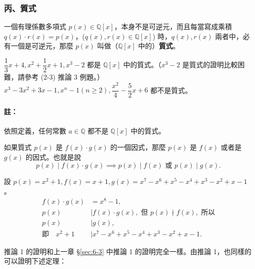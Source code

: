 \subsubsection*{丙、質式}\label{subsec:7-1-c}

\begin{definition*}
一個有理係數多項式 $p(x) \in \mathbb{Q}[x]$，本身不是可逆元，而且每當寫成乘積 $q(x) \cdot r(x) = p(x)$，($q(x), r(x) \in \mathbb{Q}[x]$) 時，$q(x), r(x)$ 兩者中，必有一個是可逆元，那麼 $p(x)$ 叫做（$\mathbb{Q}[x]$ 中的）\textbf{質式}。
\end{definition*}

\begin{example}\label{ex:7-1-8}
$\dfrac{1}{3}x+4, x^2+\dfrac{1}{2}x+1, x^3-2$ 都是 $\mathbb{Q}[x]$ 中的質式。（$x^3-2$ 是質式的證明比較困難，請參考 (2-3) 推論 3 例題。）\\
$x^3-3x^2+3x-1, x^n-1 (n \ge 2), \dfrac{x^2}{4}-\dfrac{5}{2}x+6$ 都不是質式。
\end{example}

\paragraph{註：}
依照定義，任何常數 $a \in \mathbb{Q}$ 都不是 $\mathbb{Q}[x]$ 中的質式。

\begin{corollary}\label{cor:poly_prime_div}
如果質式 $p(x)$ 是 $f(x) \cdot g(x)$ 的一個因式，那麼 $p(x)$ 是 $f(x)$ 或者是 $g(x)$ 的因式。也就是說
\begin{equation*}
  p(x) \mid f(x) \cdot g(x) \implies p(x) \mid f(x) \text{ 或 } p(x) \mid g(x).
\end{equation*}
\end{corollary}

\begin{example}\label{ex:7-1-9}
設 $p(x) = x^2+1, f(x) = x+1, g(x) = x^7-x^6+x^5-x^4+x^3-x^2+x-1$。
\begin{align*}
  f(x) \cdot g(x) &= x^8-1, \\
  p(x) &\mid f(x) \cdot g(x), \text{ 但 } p(x) \nmid f(x), \text{ 所以} \\
  p(x) &\mid g(x), \\
  \text{即} \quad x^2+1 &\mid x^7-x^6+x^5-x^4+x^3-x^2+x-1.
\end{align*}
\end{example}

推論 1 的證明和上一章 \S\ref{sec:6-3} 中推論 1 的證明完全一樣。由推論 1，也同樣的可以證明下述定理：

